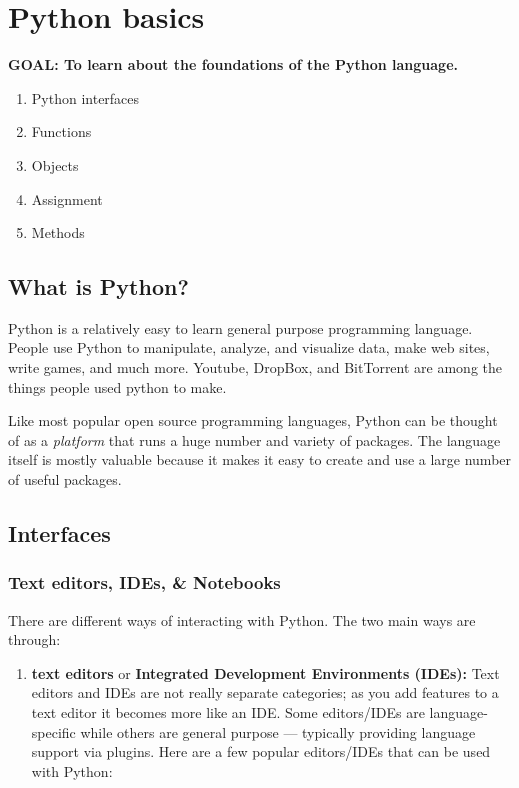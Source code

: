 \documentclass[
]{book}
\providecommand{\tightlist}{%
  \setlength{\itemsep}{0pt}\setlength{\parskip}{0pt}}
\begin{document}
\hypertarget{python-basics}{%
\section{Python basics}\label{python-basics}}

\textbf{GOAL: To learn about the foundations of the Python language.}

\begin{enumerate}
\def\labelenumi{\arabic{enumi}.}
\tightlist
\item
  Python interfaces
\item
  Functions
\item
  Objects
\item
  Assignment
\item
  Methods
\end{enumerate}

\hypertarget{what-is-python}{%
\subsection{What is Python?}\label{what-is-python}}

Python is a relatively easy to learn general purpose programming language. People use Python to manipulate, analyze, and visualize data, make web sites, write games, and much more. Youtube, DropBox, and BitTorrent are among the things people used python to make.

Like most popular open source programming languages, Python can be thought of as a \emph{platform} that runs a huge number and variety of packages. The language itself is mostly valuable because it makes it easy to create and use a large number of useful packages.

\hypertarget{interfaces-1}{%
\subsection{Interfaces}\label{interfaces-1}}

\hypertarget{text-editors-ides-notebooks-1}{%
\subsubsection{Text editors, IDEs, \& Notebooks}\label{text-editors-ides-notebooks-1}}

There are different ways of interacting with Python. The two main ways are through:

\begin{enumerate}
\def\labelenumi{\arabic{enumi}.}
\tightlist
\item
  \textbf{text editors} or \textbf{Integrated Development Environments (IDEs):} Text editors and IDEs are not really separate categories; as you add features to a text editor it becomes more like an IDE. Some editors/IDEs are language-specific while others are general purpose --- typically providing language support via plugins. Here are a few popular editors/IDEs that can be used with Python:
\end{enumerate}
\end{document}
